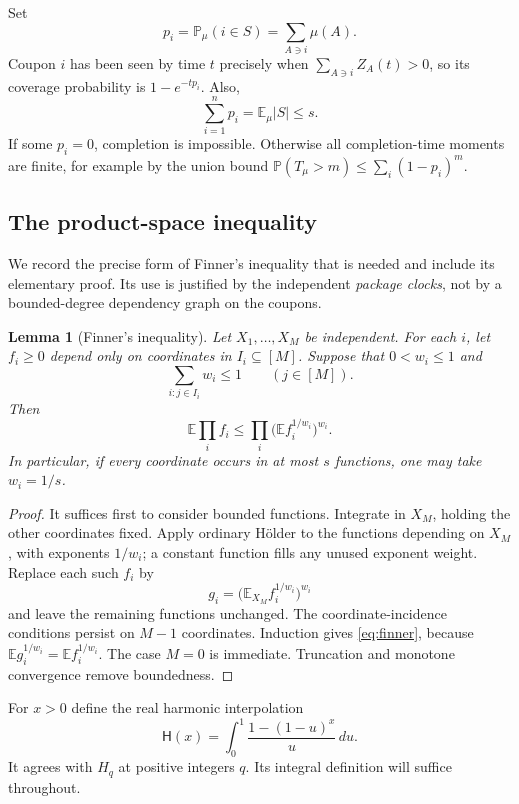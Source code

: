 \documentclass[11pt]{article}
\numberwithin{equation}{section}
\newtheorem{lemma}[theorem]{Lemma}
\theoremstyle{remark}
\newcommand{\Pp}{\mathbb P}
\newcommand{\E}{\mathbb E}
\newcommand{\1}{\mathbf 1}
\newcommand{\hreal}{\mathsf H}
\begin{document}
Set
\begin{equation}\label{eq:marginal}
 p_i=\Pp_\mu(i\in S)=\sum_{A\ni i}\mu(A).
\end{equation}
Coupon $i$ has been seen by time $t$ precisely when $\sum_{A\ni i}Z_A(t)>0$, so its coverage probability is $1-e^{-tp_i}$. Also,
\begin{equation}\label{eq:budget}
 \sum_{i=1}^n p_i=\E_\mu |S|\leq s.
\end{equation}
If some $p_i=0$, completion is impossible. Otherwise all completion-time moments are finite, for example by the union bound
$\Pp(T_\mu>m)\leq\sum_i(1-p_i)^m$.

\subsection{The product-space inequality}

We record the precise form of Finner's inequality that is needed and include its elementary proof. Its use is justified by the independent \emph{package clocks}, not by a bounded-degree dependency graph on the coupons.

\begin{lemma}[Finner's inequality]\label{lem:finner}
Let $X_1,\ldots,X_M$ be independent. For each $i$, let $f_i\geq0$ depend only on coordinates in $I_i\subseteq[M]$. Suppose that $0<w_i\leq1$ and
\[
 \sum_{i:j\in I_i}w_i\leq1\qquad(j\in[M]).
\]
Then
\begin{equation}\label{eq:finner}
 \E\prod_i f_i\leq\prod_i\bigl(\E f_i^{1/w_i}\bigr)^{w_i}.
\end{equation}
In particular, if every coordinate occurs in at most $s$ functions, one may take $w_i=1/s$.
\end{lemma}

\begin{proof}
It suffices first to consider bounded functions. Integrate in $X_M$, holding the other coordinates fixed. Apply ordinary H\"older to the functions depending on $X_M$, with exponents $1/w_i$; a constant function fills any unused exponent weight. Replace each such $f_i$ by
\[
 g_i=\bigl(\E_{X_M}f_i^{1/w_i}\bigr)^{w_i}
\]
and leave the remaining functions unchanged. The coordinate-incidence conditions persist on $M-1$ coordinates. Induction gives \eqref{eq:finner}, because
$\E g_i^{1/w_i}=\E f_i^{1/w_i}$. The case $M=0$ is immediate. Truncation and monotone convergence remove boundedness.
\end{proof}

For $x>0$ define the real harmonic interpolation
\begin{equation}\label{eq:real-harmonic}
 \hreal(x)=\int_0^1\frac{1-(1-u)^x}{u}\,du.
\end{equation}
It agrees with $H_q$ at positive integers $q$. Its integral definition will suffice throughout.
\end{document}

